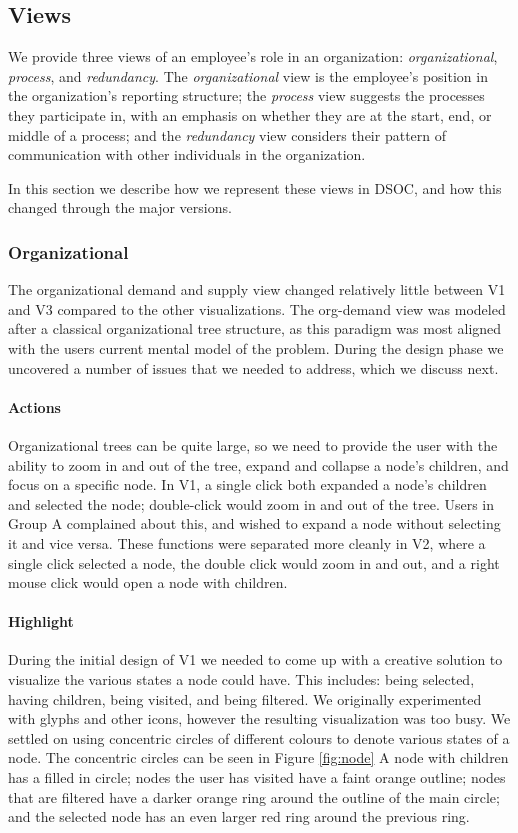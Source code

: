 \documentclass[journal]{vgtc}                %
\begin{document}
\subsection{Views}
We provide three views of an employee's role in an organization: \emph{organizational}, \emph{process}, and \emph{redundancy}. The \emph{organizational} view is the employee's position in the organization's reporting structure; the \emph{process} view suggests the processes they participate in, with an emphasis on whether they are at the start, end, or middle of a process; and the \emph{redundancy} view considers their pattern of communication with other individuals in the organization.

In this section we describe how we represent these views in DSOC, and how this changed through the major versions.

\subsubsection{Organizational}
The organizational demand and supply view changed relatively little between V1 and V3 compared to the other visualizations.  The org-demand view was modeled after a classical organizational tree structure, as this paradigm was most aligned with the users current mental model of the problem.  During the design phase we uncovered a number of issues that we needed to address, which we discuss next.

\paragraph{Actions}
Organizational trees can be quite large, so we need to provide the user with the ability to zoom in and out of the tree, expand and collapse a node's children, and focus on a specific node.  In V1, a single click both expanded a node's children and selected the node; double-click would zoom in and out of the tree.  Users in Group A complained about this, and wished to expand a node without selecting it and vice versa. These functions were separated more cleanly in V2, where a single click selected a node, the double click would zoom in and out, and a right mouse click would open a node with children.

\paragraph{Highlight}
During the initial design of V1 we needed to come up with a creative solution to visualize the various states a node could have.  This includes: being selected, having children, being visited, and being filtered.  We originally experimented with glyphs and other icons, however the resulting visualization was too busy.  We settled on using concentric circles of different colours to denote various states of a node. The concentric circles can be seen in Figure \ref{fig:node}  A node with children has a filled in circle; nodes the user has visited have a faint orange outline; nodes that are filtered have a darker orange ring around the outline of the main circle; and the selected node has an even larger red ring around the previous ring.  
\end{document}
